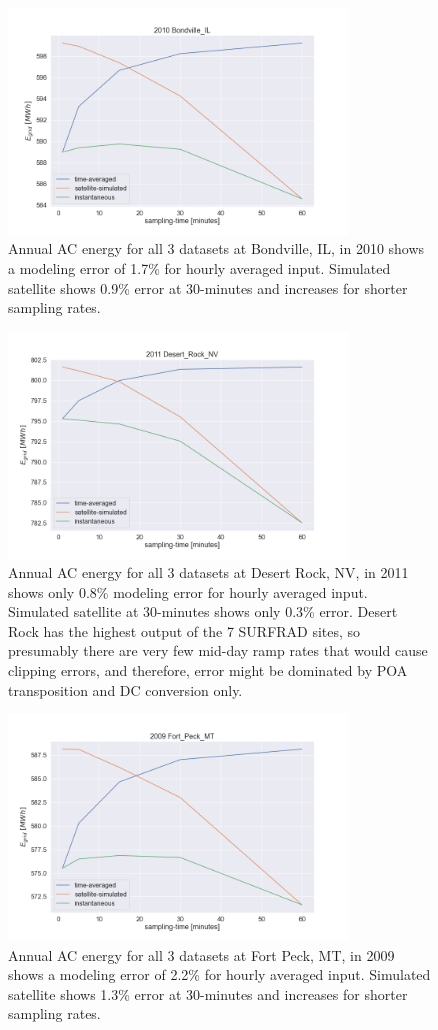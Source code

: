 \documentclass[conference]{IEEEtran}
\begin{document}
\begin{figure}[htbp]
\centerline{\includegraphics[width=9cm]{analysis/bon2010.png}}
\caption{Annual AC energy for all 3 datasets at Bondville, IL, in 2010 shows a modeling error of 1.7\% for hourly averaged input. Simulated satellite shows 0.9\% error at 30-minutes and increases for shorter sampling rates.}
\label{fig:bon2010}
\end{figure}

\begin{figure}[htbp]
\centerline{\includegraphics[width=9cm]{analysis/dra2011.png}}
\caption{Annual AC energy for all 3 datasets at Desert Rock, NV, in 2011 shows only 0.8\% modeling error for hourly averaged input. Simulated satellite at 30-minutes shows only 0.3\% error. Desert Rock has the highest output of the 7 SURFRAD sites, so presumably there are very few mid-day ramp rates that would cause clipping errors, and therefore, error might be dominated by POA transposition and DC conversion only.}
\label{fig:dra2011}
\end{figure}

\begin{figure}[htbp]
\centerline{\includegraphics[width=9cm]{analysis/fpk2009.png}}
\caption{Annual AC energy for all 3 datasets at Fort Peck, MT, in 2009 shows a modeling error of 2.2\% for hourly averaged input. Simulated satellite shows 1.3\% error at 30-minutes and increases for shorter sampling rates.}
\label{fig:fpk2009}
\end{figure}
\end{document}
